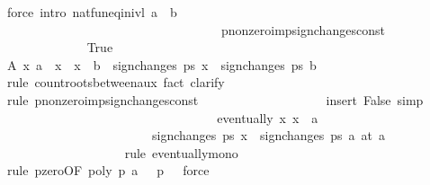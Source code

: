 \begin{isabellebody}
\ {\isacharparenleft}force\ intro{\isacharcolon}\ natfun{\isacharunderscore}eq{\isacharunderscore}in{\isacharunderscore}ivl\ {\isacharbackquoteopen}a\ {\isasymle}\ b{\isacharbackquoteclose}\ \isanewline
\ \ \ \ \ \ \ \ \ \ \ \ \ \ \ \ \ \ \ \ \ \ \ \ \ \ \ \ \ \ \ \ \ \ \ p{\isacharunderscore}nonzero{\isacharunderscore}imp{\isacharunderscore}sign{\isacharunderscore}changes{\isacharunderscore}const{\isacharparenright}\isanewline
\ \ \ \ \ \ \ \ \ \ \isamarkupfalse%
\isanewline
\ \ \ \ \ \ \ \ \ \ \ \ \isamarkupfalse%
\ True\isanewline
\ \ \ \ \ \ \ \ \ \ \ \ \ \ \isamarkupfalse%
\ A{\isacharcolon}\ {\isachardoublequoteopen}{\isasymforall}x{\isachardot}\ a\ {\isacharless}\ x\ {\isasymand}\ x\ {\isasymle}\ b\ {\isasymlongrightarrow}\ sign{\isacharunderscore}changes\ ps\ x\ {\isacharequal}\ sign{\isacharunderscore}changes\ ps\ b{\isachardoublequoteclose}\isanewline
\ \ \ \ \ \ \ \ \ \ \ \ \ \ \ \ \ \ \isamarkupfalse%
\ {\isacharparenleft}rule\ count{\isacharunderscore}roots{\isacharunderscore}between{\isacharunderscore}aux{\isacharcomma}\ fact{\isacharcomma}\ clarify{\isacharparenright}\isanewline
\ \ \ \ \ \ \ \ \ \ \ \ \ \ \ \ \ \ \isamarkupfalse%
\ {\isacharparenleft}rule\ p{\isacharunderscore}nonzero{\isacharunderscore}imp{\isacharunderscore}sign{\isacharunderscore}changes{\isacharunderscore}const{\isacharparenright}\isanewline
\ \ \ \ \ \ \ \ \ \ \ \ \ \ \ \ \ \ \isamarkupfalse%
\ {\isacharparenleft}insert\ False{\isacharcomma}\ simp{\isacharparenright}\isanewline
\ \ \ \ \ \ \ \ \ \ \ \ \ \ \ \ \ \ \isamarkupfalse%
\isanewline
\ \ \ \ \ \ \ \ \ \ \ \ \ \ \isamarkupfalse%
\ {\isachardoublequoteopen}eventually\ {\isacharparenleft}{\isasymlambda}x{\isachardot}\ x\ {\isachargreater}\ a\ {\isasymlongrightarrow}\ \isanewline
\ \ \ \ \ \ \ \ \ \ \ \ \ \ \ \ \ \ \ \ \ \ \ \ sign{\isacharunderscore}changes\ ps\ x\ {\isacharequal}\ sign{\isacharunderscore}changes\ ps\ a{\isacharparenright}\ {\isacharparenleft}at\ a{\isacharparenright}{\isachardoublequoteclose}\isanewline
\ \ \ \ \ \ \ \ \ \ \ \ \ \ \ \ \ \ \isamarkupfalse%
\ {\isacharparenleft}rule\ eventually{\isacharunderscore}mono{\isacharparenright}\ \isamarkupfalse%
\isanewline
\ \ \ \ \ \ \ \ \ \ \ \ \ \ \ \ \ \ \isamarkupfalse%
\ {\isacharparenleft}rule\ p{\isacharunderscore}zero{\isacharbrackleft}OF\ {\isacharbackquoteopen}poly\ p\ a\ {\isacharequal}\ {}{\isacharbackquoteclose}\ {\isacharbackquoteopen}p\ {\isasymnoteq}\ {}{\isacharbackquoteclose}{\isacharbrackright}{\isacharcomma}\ force{\isacharparenright}\isanewline

\end{isabellebody}
